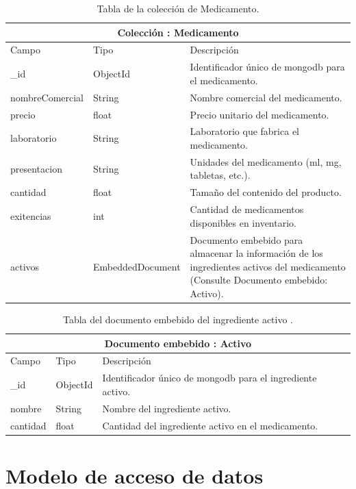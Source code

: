 	
	\begin{table}[htb]
		\centering
		\begin{tabular}{| p{3.5cm}| p{3.0cm} | p{9.8cm} |}
			\hline
			\multicolumn{3}{|c|}{Colección : Medicamento} \\
			\hline
			Campo & Tipo &  Descripción\\ \hline
			\_id & ObjectId & Identificador único de mongodb para el medicamento. \\ \hline
			nombreComercial & String & Nombre comercial del medicamento.\\ \hline
			precio & float & Precio unitario del medicamento.\\ \hline
			laboratorio & String & Laboratorio que fabrica el medicamento.\\ \hline
			presentacion & String & Unidades del medicamento (ml, mg, tabletas, etc.).\\ \hline
			cantidad & float & Tamaño del contenido del producto.\\ \hline
			exitencias & int & Cantidad de medicamentos disponibles en inventario.\\ \hline			
			activos & EmbeddedDocument & Documento embebido para almacenar la información de los ingredientes activos del medicamento (Consulte Documento embebido: Activo). \\ \hline
		\end{tabular}
		\caption{Tabla de la colección de Medicamento.}
		\label{tabla:diccionarioDatos}
	\end{table}
	
	
	\begin{table}[htb]
		\centering
		\begin{tabular}{| p{3.5cm}| p{3.0cm} | p{9.8cm} |}
			\hline
			\multicolumn{3}{|c|}{Documento embebido : Activo} \\
			\hline
			Campo & Tipo &  Descripción\\ \hline
			\_id & ObjectId & Identificador único de mongodb para el ingrediente activo. \\ \hline
			nombre & String & Nombre del ingrediente activo.\\ \hline
			cantidad & float & Cantidad del ingrediente activo en el medicamento.\\ \hline
			
		\end{tabular}
		\caption{Tabla del documento embebido del ingrediente activo .}
		\label{tabla:diccionarioDatos}
	\end{table}
	
		\newpage

	








\section{Modelo de acceso de datos}


